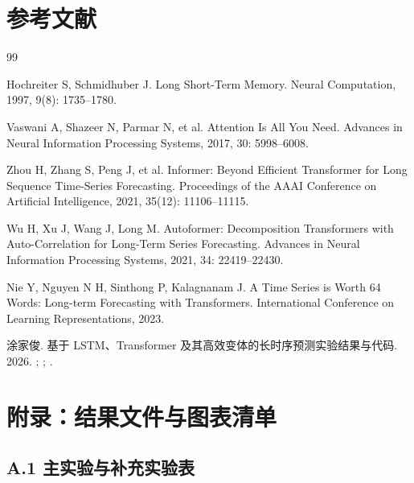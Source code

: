 \section*{参考文献}\label{ux53c2ux8003ux6587ux732e}

\begin{thebibliography}{99}
\small
\setlength{\itemsep}{0.2em}

Hochreiter S, Schmidhuber J. Long Short-Term Memory. Neural Computation, 1997, 9(8): 1735--1780.

Vaswani A, Shazeer N, Parmar N, et al. Attention Is All You Need. Advances in Neural Information Processing Systems, 2017, 30: 5998--6008.

Zhou H, Zhang S, Peng J, et al. Informer: Beyond Efficient Transformer for Long Sequence Time-Series Forecasting. Proceedings of the AAAI Conference on Artificial Intelligence, 2021, 35(12): 11106--11115.

Wu H, Xu J, Wang J, Long M. Autoformer: Decomposition Transformers with Auto-Correlation for Long-Term Series Forecasting. Advances in Neural Information Processing Systems, 2021, 34: 22419--22430.

Nie Y, Nguyen N H, Sinthong P, Kalagnanam J. A Time Series is Worth 64 Words: Long-term Forecasting with Transformers. International Conference on Learning Representations, 2023.

涂家俊. 基于 LSTM、Transformer 及其高效变体的长时序预测实验结果与代码. 2026. ; ; .

\end{thebibliography}

\section*{附录：结果文件与图表清单}\label{ux9644ux5f55ux7ed3ux679cux6587ux4ef6ux4e0eux56feux8868ux6e05ux5355}

\subsection*{A.1 主实验与补充实验表}\label{a.1-ux4e3bux5b9eux9a8cux4e0eux8865ux5145ux5b9eux9a8cux8868}

